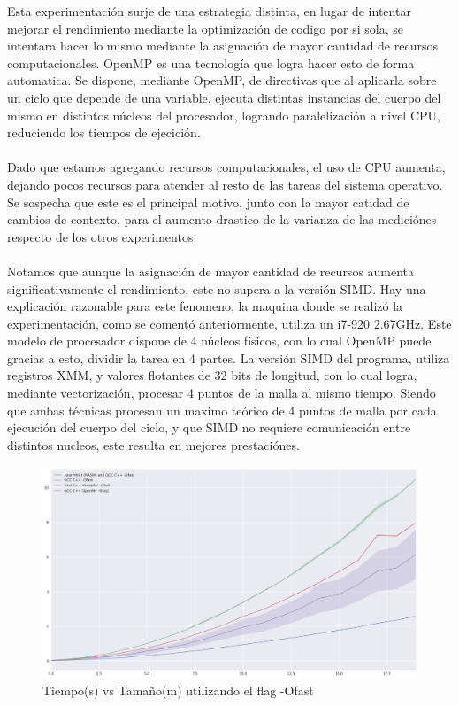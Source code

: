 Esta experimentación surje de una estrategia distinta, en lugar de intentar mejorar el rendimiento mediante la optimización de codigo por si sola, se intentara hacer lo mismo mediante la asignación de mayor cantidad de recursos computacionales. OpenMP es una tecnología que logra hacer esto de forma automatica. Se dispone, mediante OpenMP, de directivas que al aplicarla sobre un ciclo que depende de una variable, ejecuta distintas instancias del cuerpo del mismo en distintos núcleos del procesador, logrando paralelización a nivel CPU, reduciendo los tiempos de ejecición.
~\\
~\\
Dado que estamos agregando recursos computacionales, el uso de CPU aumenta, dejando pocos recursos para atender al resto de las tareas del sistema operativo. Se sospecha que este es el principal motivo, junto con la mayor catidad de cambios de contexto, para el aumento drastico de la varianza de las mediciónes respecto de los otros experimentos.
~\\
~\\
Notamos que aunque la asignación de mayor cantidad de recursos aumenta significativamente el rendimiento, este no supera a la versión SIMD. Hay una explicación razonable para este fenomeno, la maquina donde se realizó la experimentación, como se comentó anteriormente, utiliza un i7-920 2.67GHz. Este modelo de procesador dispone de 4 núcleos físicos, con lo cual OpenMP puede gracias a esto, dividir la tarea en 4 partes. La versión SIMD del programa, utiliza registros XMM, y valores flotantes de 32 bits de longitud, con lo cual logra, mediante vectorización, procesar 4 puntos de la malla al mismo tiempo. Siendo que ambas técnicas procesan un maximo teórico de 4 puntos de malla por cada ejecución del cuerpo del ciclo, y que SIMD no requiere comunicación entre distintos nucleos, este resulta en mejores prestaciónes.

\begin{figure}[H]
\caption{Tiempo(s) vs Tamaño(m) utilizando el flag -Ofast}
\includegraphics[width=\textwidth]{imagenes/plot_ofast.png}
\end{figure}

